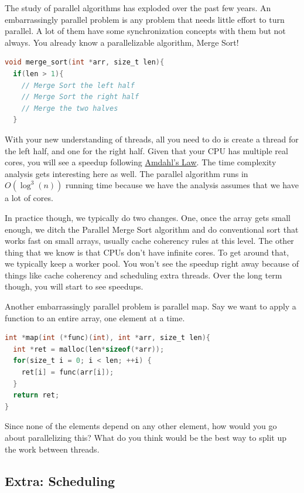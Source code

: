 The study of parallel algorithms has exploded over the past few years.
An embarrassingly parallel problem is any problem that needs little effort to turn parallel.
A lot of them have some synchronization concepts with them but not always.
You already know a parallelizable algorithm, Merge Sort!

\begin{lstlisting}[language=C]
void merge_sort(int *arr, size_t len){
  if(len > 1){
    // Merge Sort the left half
    // Merge Sort the right half
    // Merge the two halves
  }
\end{lstlisting}

With your new understanding of threads, all you need to do is create a thread for the left half, and one for the right half.
Given that your CPU has multiple real cores, you will see a speedup following \href{https://en.wikipedia.org/wiki/Amdahl's_law}{Amdahl's Law}.
The time complexity analysis gets interesting here as well.
The parallel algorithm runs in $O(\log^3(n))$ running time because we have the analysis assumes that we have a lot of cores.

In practice though, we typically do two changes.
One, once the array gets small enough, we ditch the Parallel Merge Sort algorithm and do conventional sort that works fast on small arrays, usually cache coherency rules at this level.
The other thing that we know is that CPUs don't have infinite cores.
To get around that, we typically keep a worker pool.
You won't see the speedup right away because of things like cache coherency and scheduling extra threads.
Over the long term though, you will start to see speedups.

Another embarrassingly parallel problem is parallel map.
Say we want to apply a function to an entire array, one element at a time.

\begin{lstlisting}[language=C]
int *map(int (*func)(int), int *arr, size_t len){
  int *ret = malloc(len*sizeof(*arr));
  for(size_t i = 0; i < len; ++i) {
    ret[i] = func(arr[i]);
  }
  return ret;
}
\end{lstlisting}

Since none of the elements depend on any other element, how would you go about parallelizing this?
What do you think would be the best way to split up the work between threads.

\subsection{Extra: Scheduling}

